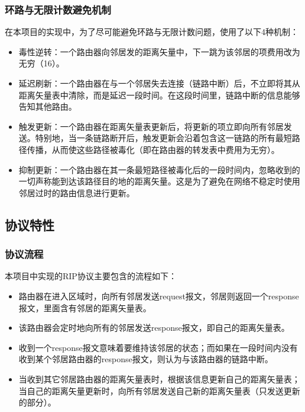 		\subsubsection{环路与无限计数避免机制}
		\label{ssub:环路与无限计数避免机制}
		在本项目的实现中，为了尽可能避免环路与无限计数问题，使用了以下4种机制：
		\begin{itemize}
			\item 毒性逆转：一个路由器向邻居发的距离矢量中，下一跳为该邻居的项费用改为无穷（16）。
			\item 延迟刷新：一个路由器在与一个邻居失去连接（链路中断）后，不立即将其从距离矢量表中清除，而是延迟一段时间。在这段时间里，链路中断的信息能够告知其他路由。
			\item 触发更新：一个路由器在距离矢量表更新后，将更新的项立即向所有邻居发送。特别地，当一条链路断开后，触发更新会沿着包含这一链路的所有最短路径传播，从而使这些路径被毒化（即在路由器的转发表中费用为无穷）。
			\item 抑制更新：一个路由器在其一条最短路径被毒化后的一段时间内，忽略收到的一切声称能到达该路径目的地的距离矢量。这是为了避免在网络不稳定时使用邻居过时的路由信息进行更新。
		\end{itemize}
	\subsection{协议特性} %
	\label{sub:协议特性}
	\subsubsection{协议流程} %
		\label{ssub:协议流程}
		本项目中实现的RIP协议主要包含的流程如下：
		\begin{itemize}
			\item 路由器在进入区域时，向所有邻居发送request报文，邻居则返回一个response报文，里面含有邻居的距离矢量表。
			\item 该路由器会定时地向所有的邻居发送response报文，即自己的距离矢量表。
			\item 收到一个response报文意味着要维持该邻居的状态；而如果在一段时间内没有收到某个邻居路由器的response报文，则认为与该路由器的链路中断。
			\item 当收到其它邻居路由器的距离矢量表时，根据该信息更新自己的距离矢量表；当自己的距离矢量更新时，向所有邻居发送自己新的距离矢量表（只发送更新的部分）。
		\end{itemize}
